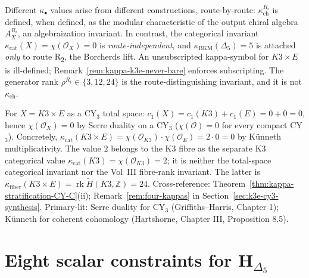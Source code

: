 \begin{remark}
\label{rem:cy-c-six-routes-kappa-per-route}
Different $\kappa_\bullet$ values arise from different constructions,
route-by-route: $\kappa_{\mathrm{ch}}^{R_i}$ is defined, when defined,
as the modular characteristic of the output chiral algebra $A_X^{R_i}$,
an algebraization invariant. In contrast, the categorical invariant
$\kappa_{\mathrm{cat}}(X) = \chi(\mathcal{O}_X) = 0$ is
\emph{route-independent}, and $\kappa_{\mathrm{BKM}}(\Delta_5) = 5$ is attached
\emph{only} to route R\textsubscript{2}, the Borcherds lift. An
unsubscripted kappa-symbol for \(K3 \times E\) is ill-defined;
Remark~\ref{rem:kappa-k3e-never-bare} enforces subscripting. The
generator rank $\rho^{R_i} \in \{3, 12, 24\}$ is the
route-distinguishing invariant, and it is not $\kappa_{\mathrm{ch}}$.
\end{remark}

\begin{remark}[\texorpdfstring{$\kappa_{\mathrm{cat}}(K3 \times E) = 0$}{kappa-cat(K3 x E) = 0} from K\"unneth and Serre]
\label{rem:cy-c-six-routes-kappa-cat-zero}
For $X = K3 \times E$ as a CY$_3$ total space: $c_1(X) = c_1(K3) + c_1(E) = 0 + 0 = 0$, hence $\chi(\mathcal{O}_X) = 0$ by Serre duality on a CY$_3$ ($\chi(\mathcal{O}) = 0$ for every compact CY$_3$). Concretely, $\kappa_{\mathrm{cat}}(K3 \times E) = \chi(\mathcal{O}_{K3}) \cdot \chi(\mathcal{O}_E) = 2 \cdot 0 = 0$ by K\"unneth multiplicativity. The value $2$ belongs to the K3 fibre as the separate K3 categorical value $\kappa_{\mathrm{cat}}(K3)=\chi(\mathcal{O}_{K3})=2$; it is neither the total-space categorical invariant nor the Vol~III fibre-rank invariant. The latter is $\kappa_{\mathrm{fiber}}(K3 \times E)=\operatorname{rk}\widetilde H(K3,\mathbb Z)=24$. Cross-reference: Theorem~\ref{thm:kappa-stratification-CY-C}(ii); Remark~\ref{rem:four-kappas} in Section~\ref{sec:k3e-cy3-synthesis}. Primary-lit: Serre duality for CY$_3$ (Griffiths--Harris, Chapter 1); K\"unneth for coherent cohomology (Hartshorne, Chapter III, Proposition 8.5).
\end{remark}

\section{Eight scalar constraints for \texorpdfstring{$\mathbf{H}_{\Delta_5}$}{H-Delta-5}}
\label{sec:cy-c-six-routes-unified-comparison}


